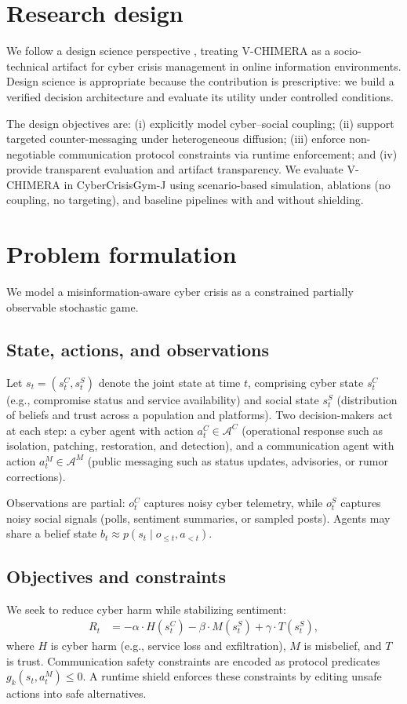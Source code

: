 \documentclass[referee,lineno,sn-basic]{sn-jnl}
\newcommand{\model}{V-CHIMERA}
\newcommand{\envname}{CyberCrisisGym-J}
\begin{document}
\section{Research design}
We follow a design science perspective \citep{hevner2004designscience,peffers2007dsrm}, treating \model{} as a socio-technical artifact for cyber crisis management in online information environments. Design science is appropriate because the contribution is prescriptive: we build a verified decision architecture and evaluate its utility under controlled conditions.

The design objectives are: (i) explicitly model cyber--social coupling; (ii) support targeted counter-messaging under heterogeneous diffusion; (iii) enforce non-negotiable communication protocol constraints via runtime enforcement; and (iv) provide transparent evaluation and artifact transparency. We evaluate \model{} in \envname{} using scenario-based simulation, ablations (no coupling, no targeting), and baseline pipelines with and without shielding.

\section{Problem formulation}
We model a misinformation-aware cyber crisis as a constrained partially observable stochastic game.

\subsection{State, actions, and observations}
Let $s_t = (s^C_t, s^S_t)$ denote the joint state at time $t$, comprising cyber state $s^C_t$ (e.g., compromise status and service availability) and social state $s^S_t$ (distribution of beliefs and trust across a population and platforms). Two decision-makers act at each step: a cyber agent with action $a^C_t \in \mathcal{A}^C$ (operational response such as isolation, patching, restoration, and detection), and a communication agent with action $a^M_t \in \mathcal{A}^M$ (public messaging such as status updates, advisories, or rumor corrections).

Observations are partial: $o^C_t$ captures noisy cyber telemetry, while $o^S_t$ captures noisy social signals (polls, sentiment summaries, or sampled posts). Agents may share a belief state $b_t \approx p(s_t \mid o_{\le t}, a_{<t})$.

\subsection{Objectives and constraints}
We seek to reduce cyber harm while stabilizing sentiment:
\begin{align}
R_t &= -\alpha \cdot H(s^C_t) - \beta \cdot M(s^S_t) + \gamma \cdot T(s^S_t),
\end{align}
where $H$ is cyber harm (e.g., service loss and exfiltration), $M$ is misbelief, and $T$ is trust. Communication safety constraints are encoded as protocol predicates $g_k(s_t,a^M_t) \le 0$. A runtime shield enforces these constraints by editing unsafe actions into safe alternatives.
\end{document}
